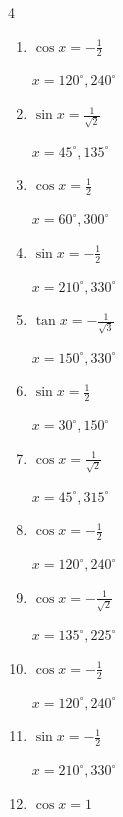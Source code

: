 \begin{multicols}{4}
\begin{enumerate}
  \item $\displaystyle \cos{x}  = -\frac{1}{2}$

        $\displaystyle x = 120^{\circ} , 240^{\circ}$

  \item $\displaystyle \sin{x}  = \frac{1}{\sqrt{2}}$

        $\displaystyle x = 45^{\circ} , 135^{\circ}$

  \item $\displaystyle \cos{x}  = \frac{1}{2}$

        $\displaystyle x = 60^{\circ} , 300^{\circ}$

  \item $\displaystyle \sin{x}  = -\frac{1}{2}$

        $\displaystyle x = 210^{\circ} , 330^{\circ}$

  \item $\displaystyle \tan{x}  = -\frac{1}{\sqrt{3}}$

        $\displaystyle x = 150^{\circ} , 330^{\circ}$

  \item $\displaystyle \sin{x}  = \frac{1}{2}$

        $\displaystyle x = 30^{\circ} , 150^{\circ}$

  \item $\displaystyle \cos{x}  = \frac{1}{\sqrt{2}}$

        $\displaystyle x = 45^{\circ} , 315^{\circ}$

  \item $\displaystyle \cos{x}  = -\frac{1}{2}$

        $\displaystyle x = 120^{\circ} , 240^{\circ}$

  \item $\displaystyle \cos{x}  = -\frac{1}{\sqrt{2}}$

        $\displaystyle x = 135^{\circ} , 225^{\circ}$

  \item $\displaystyle \cos{x}  = -\frac{1}{2}$

        $\displaystyle x = 120^{\circ} , 240^{\circ}$

  \item $\displaystyle \sin{x}  = -\frac{1}{2}$

        $\displaystyle x = 210^{\circ} , 330^{\circ}$

  \item $\displaystyle \cos{x}  = 1$


\end{enumerate}
\end{multicols}
